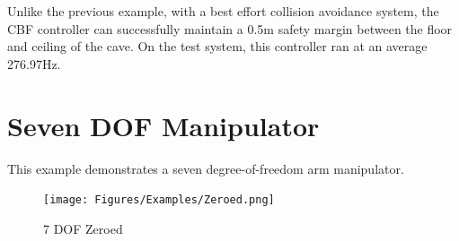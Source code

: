 \noindent Unlike the previous example, with a best effort collision avoidance system, the CBF controller can successfully maintain a 0.5m safety margin between the floor and ceiling of the cave. On the test system, this controller ran at an average 276.97Hz.

\section{Seven DOF Manipulator}  \label{sec:7dof}

\noindent This example demonstrates a seven degree-of-freedom arm manipulator.

\begin{figure}[H]
    \centering
    \texttt{[image: Figures/Examples/Zeroed.png]}
    \caption{7 DOF Zeroed}
    \label{fig:7dofzero}
\end{figure}

